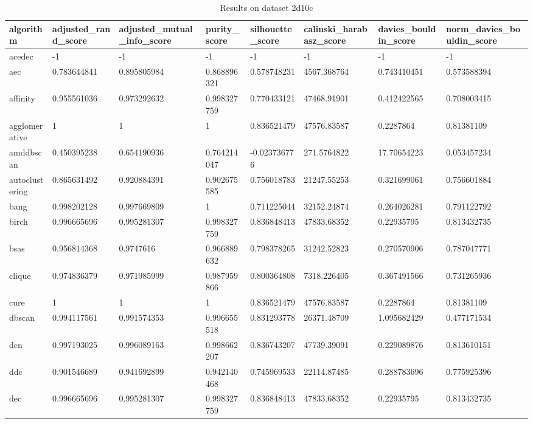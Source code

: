 \begin{table}[H]
\centering
\caption{Results on dataset 2d10c}
\label{S50_Table}
\begin{tabular}{|l|l|l|l|l|l|l|l|}
\hline
algorithm & adjusted\_rand\_score & adjusted\_mutual\_info\_score & purity\_score & silhouette\_score & calinski\_harabasz\_score & davies\_bouldin\_score & norm\_davies\_bouldin\_score \\
\hline
acedec & -1 & -1 & -1 & -1 & -1 & -1 & -1 \\
\hline
aec & 0.783644841 & 0.895805984 & 0.868896321 & 0.578748231 & 4567.368764 & 0.743410451 & 0.573588394 \\
\hline
affinity & 0.955561036 & 0.973292632 & 0.998327759 & 0.770433121 & 47468.91901 & 0.412422565 & 0.708003415 \\
\hline
agglomerative & 1 & 1 & 1 & 0.836521479 & 47576.83587 & 0.2287864 & 0.81381109 \\
\hline
amddbscan & 0.450395238 & 0.654190936 & 0.764214047 & -0.023736776 & 271.5764822 & 17.70654223 & 0.053457234 \\
\hline
autoclustering & 0.865631492 & 0.920884391 & 0.902675585 & 0.756018783 & 21247.55253 & 0.321699061 & 0.756601884 \\
\hline
bang & 0.998202128 & 0.997669809 & 1 & 0.711225044 & 32152.24874 & 0.264026281 & 0.791122792 \\
\hline
birch & 0.996665696 & 0.995281307 & 0.998327759 & 0.836848413 & 47833.68352 & 0.22935795 & 0.813432735 \\
\hline
bsas & 0.956814368 & 0.9747616 & 0.966889632 & 0.798378265 & 31242.52823 & 0.270570906 & 0.787047771 \\
\hline
clique & 0.974836379 & 0.971985999 & 0.987959866 & 0.800364808 & 7318.226405 & 0.367491566 & 0.731265936 \\
\hline
cure & 1 & 1 & 1 & 0.836521479 & 47576.83587 & 0.2287864 & 0.81381109 \\
\hline
dbscan & 0.994117561 & 0.991574353 & 0.996655518 & 0.831293778 & 26371.48709 & 1.095682429 & 0.477171534 \\
\hline
dcn & 0.997193025 & 0.996089163 & 0.998662207 & 0.836743207 & 47739.39091 & 0.229089876 & 0.813610151 \\
\hline
ddc & 0.901546689 & 0.941692899 & 0.942140468 & 0.745969533 & 22114.87485 & 0.288783696 & 0.775925396 \\
\hline
dec & 0.996665696 & 0.995281307 & 0.998327759 & 0.836848413 & 47833.68352 & 0.22935795 & 0.813432735 \\

\end{tabular}
\end{table}
